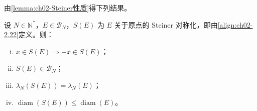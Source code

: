 \documentclass[../../main.tex]{subfiles}%
\begin{document}
由\cref{lemma:ch02-Steiner性质}得下列结果。

\begin{theorem}\label{theorem:ch02-Steiner}
设 $N\in\mathbb N^*$，$E\in\mathscr B_N$，$S(E)$ 为 $E$ 关于原点的 Steiner 对称化，即由\eqref{align:ch02-2.22}定义。则：
\begin{enumerate}[(i)]
\item $x\in S(E)\Rightarrow-x\in S(E)$；
\item $S(E)\in\mathscr B_N$；
\item $\lambda_N(S(E))=\lambda_N(E)$；
\item $\operatorname{diam}(S(E))\leqslant\operatorname{diam}(E)$。
\end{enumerate}
\end{theorem}

\end{document}
